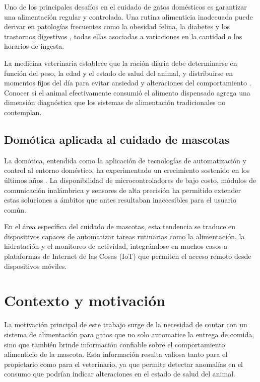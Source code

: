 Uno de los principales desafíos en el cuidado de gatos domésticos es garantizar una alimentación regular y controlada. Una rutina alimenticia inadecuada puede derivar en patologías frecuentes como la obesidad felina, la diabetes y los trastornos digestivos \cite{nutritional}, todas ellas asociadas a variaciones en la cantidad o los horarios de ingesta.

La medicina veterinaria establece que la ración diaria debe determinarse en función del peso, la edad y el estado de salud del animal, y distribuirse en momentos fijos del día para evitar ansiedad y alteraciones del comportamiento \cite{senior_pet_nutrition}. Conocer si el animal efectivamente consumió el alimento dispensado agrega una dimensión diagnóstica que los sistemas de alimentación tradicionales no contemplan.


\subsection{Domótica aplicada al cuidado de mascotas}

La domótica, entendida como la aplicación de tecnologías de automatización y control al entorno doméstico, ha experimentado un crecimiento sostenido en los últimos años \cite{smarthome}. La disponibilidad de microcontroladores de bajo costo, módulos de comunicación inalámbrica y sensores de alta precisión ha permitido extender estas soluciones a ámbitos que antes resultaban inaccesibles para el usuario común.

En el área específica del cuidado de mascotas, esta tendencia se traduce en dispositivos capaces de automatizar tareas rutinarias como la alimentación, la hidratación y el monitoreo de actividad, integrándose en muchos casos a plataformas de Internet de las Cosas (IoT) que permiten el acceso remoto desde dispositivos móviles.


\section{Contexto y motivación}

La motivación principal de este trabajo surge de la necesidad de contar con un sistema de alimentación para gatos que no solo automatice la entrega de comida, sino que también brinde información confiable sobre el comportamiento alimenticio de la mascota. Esta información resulta valiosa tanto para el propietario como para el veterinario, ya que permite detectar anomalías en el consumo que podrían indicar alteraciones en el estado de salud del animal.

